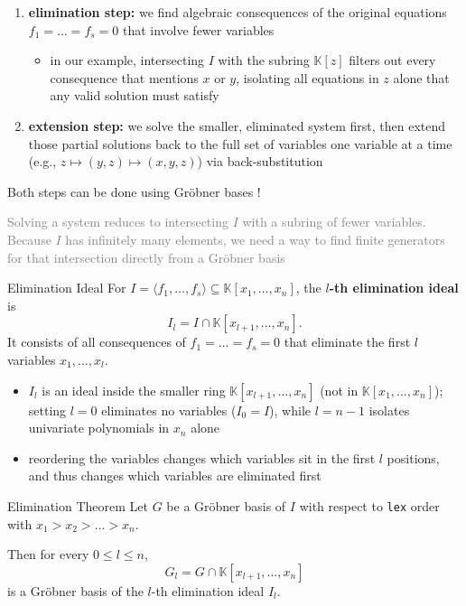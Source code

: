 \documentclass[a4paper, 11pt]{report}
\begin{document}
\begin{enumerate}
    \item \textbf{elimination step:} we find algebraic consequences of the original equations $f_1 = \dots = f_s = 0$ that involve fewer variables
    \begin{itemize}
        \item in our example, intersecting $I$ with the subring $\mathbb{K}[z]$ filters out every consequence that mentions $x$ or $y$, isolating all equations in $z$ alone that any valid solution must satisfy 
    \end{itemize}
    \item \textbf{extension step:} we solve the smaller, eliminated system first, then extend those partial solutions back to the full set of variables one variable at a time (e.g., $z \mapsto (y, z) \mapsto (x, y, z)$) via back-substitution
\end{enumerate}

Both steps can be done using Gröbner bases !

\textcolor{gray}{Solving a system reduces to intersecting $I$ with a subring of fewer variables. Because $I$ has infinitely many elements, we need a way to find finite generators for that intersection directly from a Gröbner basis}

\begin{defframe}{Elimination Ideal}{}
    For $I = \langle f_1, \dots, f_s \rangle \subseteq \mathbb{K}[x_1, \dots, x_n]$, the \textbf{$l$-th elimination ideal} is
    $$ I_l = I \cap \mathbb{K}[x_{l+1}, \dots, x_n]. $$
    It consists of all consequences of $f_1 = \dots = f_s = 0$ that eliminate the first $l$ variables $x_1, \dots, x_l$.
\end{defframe}

\begin{itemize}
    \item $I_l$ is an ideal inside the smaller ring $\mathbb{K}[x_{l+1}, \dots, x_n]$ (not in $\mathbb{K}[x_1, \dots, x_n]$); setting $l = 0$ eliminates no variables ($I_0 = I$), while $l = n - 1$ isolates univariate polynomials in $x_n$ alone
    \item reordering the variables changes which variables sit in the first $l$ positions, and thus changes which variables are eliminated first
\end{itemize}

\begin{thmframe}{Elimination Theorem}{}
    Let $G$ be a Gröbner basis of $I$ with respect to \texttt{lex} order with $x_1 > x_2 > \dots > x_n$. 

    Then for every $0 \le l \le n$,
    $$ G_l = G \cap \mathbb{K}[x_{l+1}, \dots, x_n] $$
    is a Gröbner basis of the $l$-th elimination ideal $I_l$.
\end{thmframe}
\end{document}
